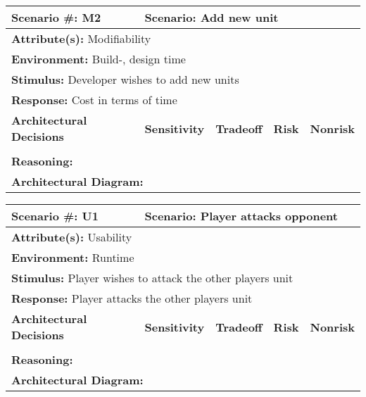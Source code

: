\begin{tabular}{|m{}|m{}|m{}|m{}|m{}|m{}|}
  \hline
  {\bf Scenario \#:} M2 & \multicolumn{5}{m{0.75 \textwidth}|}{{\bf Scenario:} Add new unit} \\ \hline
  \multicolumn{6}{|m{0.9 \textwidth}|}{{\bf Attribute(s):} Modifiability} \\ \hline
  \multicolumn{6}{|m{0.9 \textwidth}|}{{\bf Environment:} Build-, design time} \\ \hline
  \multicolumn{6}{|m{0.9 \textwidth}|}{{\bf Stimulus:} Developer wishes to add new units} \\ \hline
  \multicolumn{6}{|m{0.9 \textwidth}|}{{\bf Response:} Cost in terms of time} \\ \hline
  \multicolumn{2}{|m{0.3 \textwidth}|}{\bf Architectural Decisions} & {\bf Sensitivity} & {\bf Tradeoff} & {\bf Risk} & {\bf Nonrisk} \\ \hline
  \multicolumn{2}{|m{0.3 \textwidth}|}{} &  &  &  &  \\ \hline
  \multicolumn{6}{|m{0.9 \textwidth}|}{{\bf Reasoning:} } \\ \hline
  \multicolumn{6}{|m{0.9 \textwidth}|}{{\bf Architectural Diagram:} } \\ \hline
\end{tabular}

\begin{tabular}{|m{}|m{}|m{}|m{}|m{}|m{}|}
  \hline
  {\bf Scenario \#:} U1 & \multicolumn{5}{m{0.75 \textwidth}|}{{\bf Scenario:} Player attacks opponent} \\ \hline
  \multicolumn{6}{|m{0.9 \textwidth}|}{{\bf Attribute(s):} Usability} \\ \hline
  \multicolumn{6}{|m{0.9 \textwidth}|}{{\bf Environment:} Runtime} \\ \hline
  \multicolumn{6}{|m{0.9 \textwidth}|}{{\bf Stimulus:} Player wishes to attack the other players unit} \\ \hline
  \multicolumn{6}{|m{0.9 \textwidth}|}{{\bf Response:} Player attacks the other players unit} \\ \hline
  \multicolumn{2}{|m{0.3 \textwidth}|}{\bf Architectural Decisions} & {\bf Sensitivity} & {\bf Tradeoff} & {\bf Risk} & {\bf Nonrisk} \\ \hline
  \multicolumn{2}{|m{0.3 \textwidth}|}{} &  &  &  &  \\ \hline
  \multicolumn{6}{|m{0.9 \textwidth}|}{{\bf Reasoning:} } \\ \hline
  \multicolumn{6}{|m{0.9 \textwidth}|}{{\bf Architectural Diagram:} } \\ \hline
\end{tabular}

